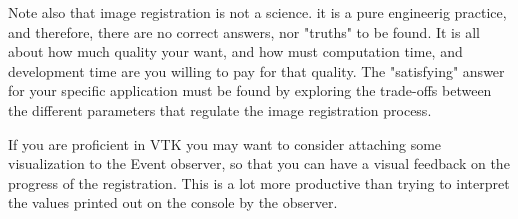 Note also that image registration is not a science. it is a pure
engineerig practice, and therefore, there are no correct answers,
nor "truths" to be found. It is all about how much quality your want,
and how must computation time, and development time are you
willing to pay for that quality. The "satisfying" answer for your
specific application must be found by exploring the trade-offs
between the different parameters that regulate the image
registration process.

If you are proficient in VTK you may want to consider attaching
some visualization to the Event observer, so that you can have
a visual feedback on the progress of the registration. This is a
lot more productive than trying to interpret the values printed
out on the console by the observer.
